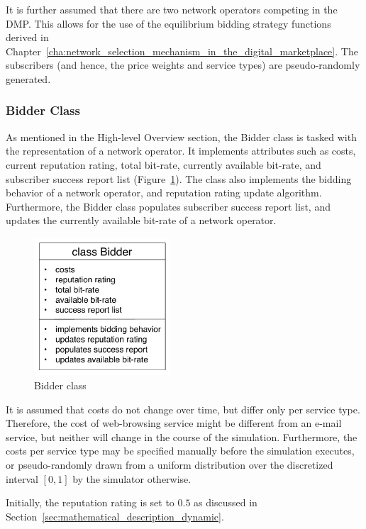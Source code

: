 It is further assumed that there are two network operators competing in the DMP. This allows for the use of the equilibrium bidding strategy functions derived in Chapter~\ref{cha:network_selection_mechanism_in_the_digital_marketplace}. The subscribers (and  hence, the price weights and service types) are pseudo-randomly generated.

\subsubsection{Bidder Class} %
\label{ssub:bidder_class_dynamic}
As mentioned in the High-level Overview section, the Bidder class is tasked with the representation of a network operator. It implements attributes such as costs, current reputation rating, total bit-rate, currently available bit-rate, and subscriber success report list (Figure~\ref{fig:bidder_class_dynamic}). The class also implements the bidding behavior of a network operator, and reputation rating update algorithm. Furthermore, the Bidder class populates subscriber success report list, and updates the currently available bit-rate of a network operator.

\begin{figure}[t]
	\includegraphics[width=2in]{3/Figures/bidder_class}
	\caption{Bidder class}
	\label{fig:bidder_class_dynamic}
\end{figure}

It is assumed that costs do not change over time, but differ only per service type. Therefore, the cost of web-browsing service might be different from an e-mail service, but neither will change in the course of the simulation. Furthermore, the costs per service type may be specified manually before the simulation executes, or pseudo-randomly drawn from a uniform distribution over the discretized interval $[0,1]$ by the simulator otherwise.

Initially, the reputation rating is set to $0.5$ as discussed in Section~\ref{sec:mathematical_description_dynamic}.

